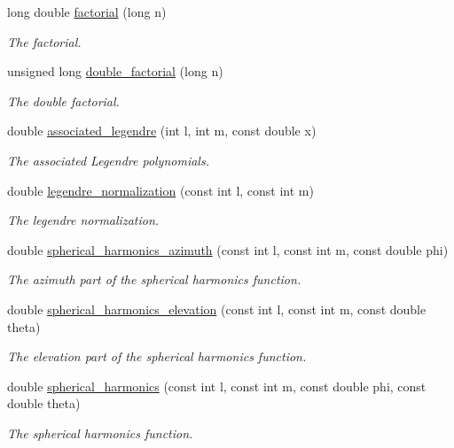 \begin{DoxyCompactItemize}
long double \hyperlink{namespace_hoa_a0a42d201c216cf76c4cdcebab728227d}{factorial} (long n)
\begin{DoxyCompactList}\small\item\em The factorial. \end{DoxyCompactList}\item 
unsigned long \hyperlink{namespace_hoa_a8a19fc23057ab1e829bcb83b8e9bf236}{double\-\_\-factorial} (long n)
\begin{DoxyCompactList}\small\item\em The double factorial. \end{DoxyCompactList}\item 
double \hyperlink{namespace_hoa_adb762b8ea445347c41725a66bff424ec}{associated\-\_\-legendre} (int l, int m, const double x)
\begin{DoxyCompactList}\small\item\em The associated Legendre polynomials. \end{DoxyCompactList}\item 
double \hyperlink{namespace_hoa_af22a7c314138f53fd15901567045c65d}{legendre\-\_\-normalization} (const int l, const int m)
\begin{DoxyCompactList}\small\item\em The legendre normalization. \end{DoxyCompactList}\item 
double \hyperlink{namespace_hoa_a746287cf728e5445e744ab01784175e6}{spherical\-\_\-harmonics\-\_\-azimuth} (const int l, const int m, const double phi)
\begin{DoxyCompactList}\small\item\em The azimuth part of the spherical harmonics function. \end{DoxyCompactList}\item 
double \hyperlink{namespace_hoa_a6515939c558d1e535c4561aee6febde6}{spherical\-\_\-harmonics\-\_\-elevation} (const int l, const int m, const double theta)
\begin{DoxyCompactList}\small\item\em The elevation part of the spherical harmonics function. \end{DoxyCompactList}\item 
double \hyperlink{namespace_hoa_aee959ace8e8c9f2c5a2bb01bfe33719d}{spherical\-\_\-harmonics} (const int l, const int m, const double phi, const double theta)
\begin{DoxyCompactList}\small\item\em The spherical harmonics function. \end{DoxyCompactList}\item 

\end{DoxyCompactItemize}
